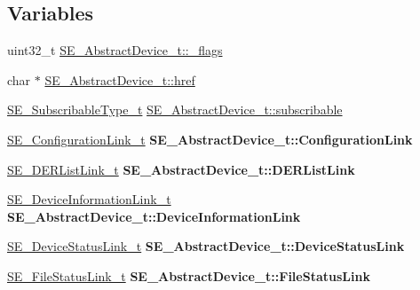\subsection*{Variables}
\begin{DoxyCompactItemize}
\item 
uint32\+\_\+t \hyperlink{group__AbstractDevice_gaebf23551088374995ff737d4849f46b7}{S\+E\+\_\+\+Abstract\+Device\+\_\+t\+::\+\_\+flags}
\item 
char $\ast$ \hyperlink{group__AbstractDevice_gaadb55d913e28d17f3600e87dea61959e}{S\+E\+\_\+\+Abstract\+Device\+\_\+t\+::href}
\item 
\hyperlink{group__SubscribableType_ga5c41f553d369710ed34619266bf2551e}{S\+E\+\_\+\+Subscribable\+Type\+\_\+t} \hyperlink{group__AbstractDevice_ga45b4dabefeecfb3f2e517060d8e025b6}{S\+E\+\_\+\+Abstract\+Device\+\_\+t\+::subscribable}
\item 
\mbox{\label{group__AbstractDevice_gaa79f8930fb03e680c9cc50c17d4959bd}} 
\hyperlink{structSE__ConfigurationLink__t}{S\+E\+\_\+\+Configuration\+Link\+\_\+t} {\bfseries S\+E\+\_\+\+Abstract\+Device\+\_\+t\+::\+Configuration\+Link}
\item 
\mbox{\label{group__AbstractDevice_ga1726b059d3164f0ea4cb9801c1bdfda9}} 
\hyperlink{structSE__DERListLink__t}{S\+E\+\_\+\+D\+E\+R\+List\+Link\+\_\+t} {\bfseries S\+E\+\_\+\+Abstract\+Device\+\_\+t\+::\+D\+E\+R\+List\+Link}
\item 
\mbox{\label{group__AbstractDevice_gacbe39d817a10c6bbc98ff4439650b362}} 
\hyperlink{structSE__DeviceInformationLink__t}{S\+E\+\_\+\+Device\+Information\+Link\+\_\+t} {\bfseries S\+E\+\_\+\+Abstract\+Device\+\_\+t\+::\+Device\+Information\+Link}
\item 
\mbox{\label{group__AbstractDevice_ga534477bfcd45976ca90f8f0868fd86bf}} 
\hyperlink{structSE__DeviceStatusLink__t}{S\+E\+\_\+\+Device\+Status\+Link\+\_\+t} {\bfseries S\+E\+\_\+\+Abstract\+Device\+\_\+t\+::\+Device\+Status\+Link}
\item 
\mbox{\label{group__AbstractDevice_ga19d333382251c2e88f985774bbd7bddd}} 
\hyperlink{structSE__FileStatusLink__t}{S\+E\+\_\+\+File\+Status\+Link\+\_\+t} {\bfseries S\+E\+\_\+\+Abstract\+Device\+\_\+t\+::\+File\+Status\+Link}

\end{DoxyCompactItemize}

